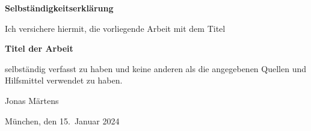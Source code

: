 \thispagestyle{empty}
    \vspace*{1cm}
    {\huge \textbf{Selbständigkeitserklärung}}\\
    \vspace*{1.5cm}

    Ich versichere hiermit, die vorliegende Arbeit mit dem Titel

    \begin{center}
        \textbf{Titel der Arbeit}
    \end{center}

    selbständig verfasst zu haben und keine anderen als die angegebenen Quellen und Hilfsmittel verwendet zu haben.

    \vspace*{3cm}

    Jonas Märtens

    \vspace*{1cm}
    München, den 15.~Januar 2024
